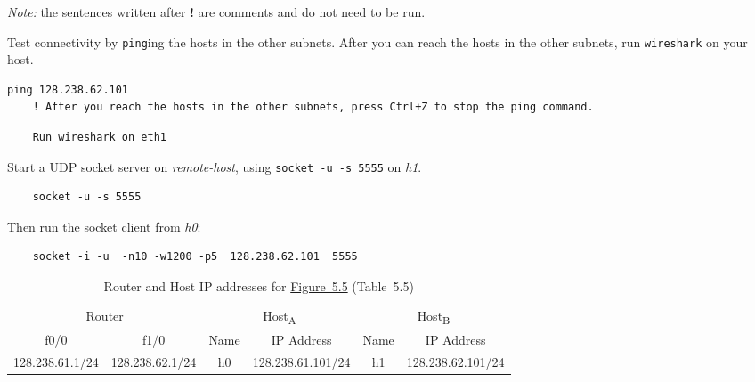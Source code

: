 \documentclass{UTNetLab}
\begin{document}
\textit{Note: }the sentences written after \textbf{!} are comments and do not need to be run. 
   
    Test connectivity by \lstinline{ping}ing the hosts in the other subnets. After you can reach the hosts in the other subnets, run \lstinline{wireshark} on your host.
    
   \begin{lstlisting}[frame=trBL,language={cisco}]
 	ping 128.238.62.101 
 	! After you reach the hosts in the other subnets, press Ctrl+Z to stop the ping command.
   \end{lstlisting} 
   
  \begin{lstlisting}
    Run wireshark on eth1
  \end{lstlisting} 
  
    Start a UDP socket server on \textit{remote-host}, using \lstinline{socket -u -s 5555} on \textit{h1}.   
    
    \begin{lstlisting}
    socket -u -s 5555
    \end{lstlisting}

 Then run the socket client from \textit{h0}:
    
  \begin{lstlisting}
   	socket -i -u  -n10 -w1200 -p5  128.238.62.101  5555
  \end{lstlisting}

    \begin{table}[H]
        \caption{Router and Host IP addresses for \hyperref[fig:5.5]{Figure~5.5} (Table~5.5)}
        \centering
        \begin{tabular}{ *2c|*2c|*2c }
            \hline \hline
            \multicolumn{2}{c|}{Router} & \multicolumn{2}{c|}{Host\textsubscript{A}} & \multicolumn{2}{c}{Host\textsubscript{B}} \\
            f0/0 & f1/0 & Name & IP Address & Name & IP Address \\
            \hline 
            128.238.61.1/24 & 128.238.62.1/24 & h0 & 128.238.61.101/24 & h1 & 128.238.62.101/24 \\
            \hline \hline
            \end{tabular}
    \end{table}
\end{document}
